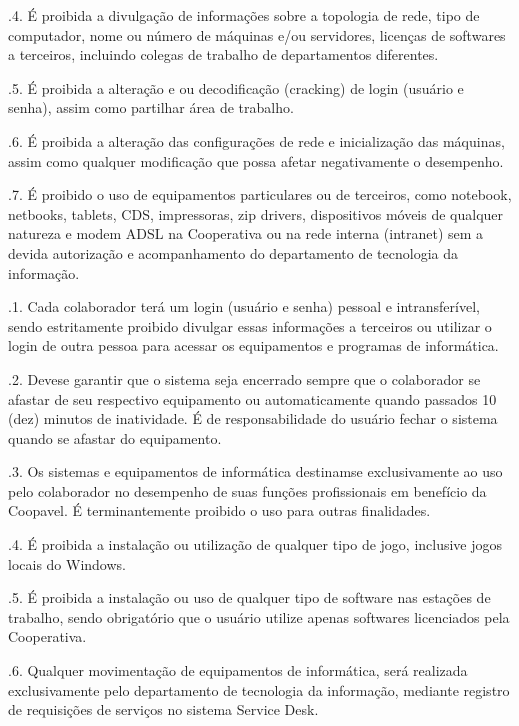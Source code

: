 \documentclass[a4paper,10pt,portuges]{sphinxmanual}
\begin{document}
.4. É proibida a divulgação de informações sobre a topologia de rede, tipo de
computador, nome ou número de máquinas e/ou servidores, licenças de softwares a
terceiros, incluindo colegas de trabalho de departamentos diferentes.

.5. É proibida a alteração e ou decodificação (cracking) de login (usuário e senha),
assim como partilhar área de trabalho.

.6. É proibida a alteração das configurações de rede e inicialização das máquinas,
assim como qualquer modificação que possa afetar negativamente o desempenho.

.7. É proibido o uso de equipamentos particulares ou de terceiros, como notebook,
netbooks, tablets, CDS, impressoras, zip drivers, dispositivos móveis de qualquer
natureza e modem ADSL na Cooperativa ou na rede interna (intranet) sem a devida
autorização e acompanhamento do departamento de tecnologia da informação.

.1. Cada colaborador terá um login (usuário e senha) pessoal e intransferível, sendo
estritamente proibido divulgar essas informações a terceiros ou utilizar o login de outra
pessoa para acessar os equipamentos e programas de informática.

.2. Deve\sphinxhyphen{}se garantir que o sistema seja encerrado sempre que o colaborador se afastar
de seu respectivo equipamento ou automaticamente quando passados 10 (dez) minutos de
inatividade. É de responsabilidade do usuário fechar o sistema quando se afastar do
equipamento.

.3. Os sistemas e equipamentos de informática destinam\sphinxhyphen{}se exclusivamente ao uso pelo
colaborador no desempenho de suas funções profissionais em benefício da Coopavel. É
terminantemente proibido o uso para outras finalidades.

.4. É proibida a instalação ou utilização de qualquer tipo de jogo, inclusive jogos locais
do Windows.

.5. É proibida a instalação ou uso de qualquer tipo de software nas estações de trabalho,
sendo obrigatório que o usuário utilize apenas softwares licenciados pela Cooperativa.

.6. Qualquer movimentação de equipamentos de informática, será realizada
exclusivamente pelo departamento de tecnologia da informação, mediante registro de
requisições de serviços no sistema Service Desk.
\end{document}
